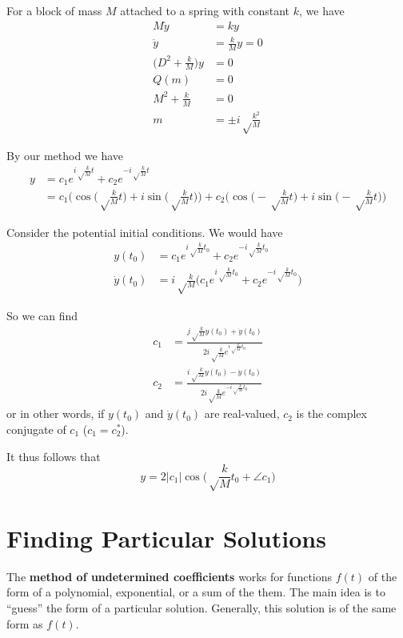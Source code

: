 \documentclass[12pt]{article}
\begin{document}
\begin{example}
For a block of mass $M$ attached to a spring with constant $k$, we have
\begin{align*}
M\ddot y &= ky\\
\ddot y &= \frac{k}{M}y = 0\\
\bigg(D^2 + \frac{k}{M}\bigg)y &= 0\\
Q(m) &= 0\\
M^2 + \frac{k}{M} &= 0\\
m &= \pm i\sqrt\frac{k^2}{M}
\end{align*}

By our method we have
\begin{align*}
y &= c_1 e^{i\sqrt\frac{k}{M} t} + c_2 e^{-i\sqrt\frac{k}{M} t}\\
&= c_1\bigg( \cos\bigl(\sqrt\frac{k}{M} t\bigl) + i\sin\bigl(\sqrt\frac{k}{M} t\bigl)\bigg) + c_2 \bigg(\cos\bigl(-\sqrt\frac{k}{M} t\bigl) + i\sin\bigl(-\sqrt\frac{k}{M} t\bigl)\bigg)
\end{align*}

Consider the potential initial conditions. We would have
\begin{align*}
y(t_0) &= c_1 e^{i\sqrt\frac{k}{M} t_0} + c_2 e^{-i\sqrt\frac{k}{M} t_0}\\
\dot y(t_0) &= i\sqrt\frac{k}{M} \bigg(c_1 e^{i\sqrt\frac{k}{M} t_0} + c_2 e^{-i\sqrt\frac{k}{M} t_0}\bigg)
\end{align*}

So we can find
\begin{align*}
c_1 &= \frac{j\sqrt\frac{k}{M} y(t_0) + \dot y(t_0)}{2i\sqrt\frac{k}{M} e^{i\sqrt\frac{k}{M} t_0}}\\
c_2 &= \frac{i\sqrt\frac{k}{M} y(t_0) - \dot y(t_0)}{2i\sqrt\frac{k}{M} e^{-i\sqrt\frac{k}{M} t_0}}
\end{align*}
or in other words, if $y(t_0)$ and $\dot y(t_0)$ are real-valued, $c_2$ is the complex conjugate of $c_1$ ($c_1 = c_2^*$).

It thus follows that \[ y = 2 |c_1| \cos\bigg(\sqrt\frac{k}{M} t_0 + \angle c_1\bigg) \]
\end{example}

\section{Finding Particular Solutions}
The {\bf method of undetermined coefficients} works for functions $f(t)$ of the form of a polynomial, exponential, or a sum of the them. The main idea is to ``guess'' the form of a particular solution. Generally, this solution is of the same form as $f(t)$.
\end{document}
